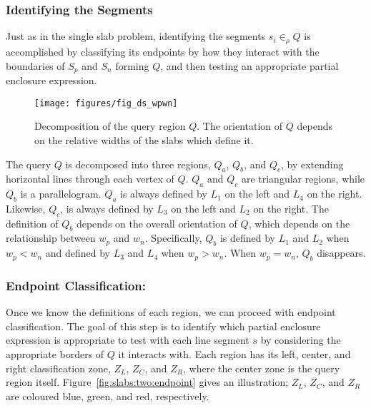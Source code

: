 \subsubsection{Identifying the Segments}
\label{:slabs:two:approach}

Just as in the single slab problem, identifying the segments $s_i \in_\rho Q$ 
is accomplished by classifying its endpoints by how they interact with 
the boundaries of $S_p$ and $S_n$ forming $Q$,  and then testing an appropriate 
partial enclosure expression. 

\begin{figure}[t]
\begin{center}
  \texttt{[image: figures/fig\_ds\_wpwn]}
  \caption[Decomposition of the query region $Q$.]{Decomposition of the query 
region $Q$. The orientation of $Q$ depends on the relative widths of the slabs 
which define it.}
  \label{fig:slabs:two:wpwn}
\end{center}
\end{figure}


The query $Q$ is decomposed into three regions, $Q_a$, $Q_b$, and $Q_c$, by 
extending horizontal lines through each vertex of $Q$.
$Q_a$ and $Q_c$ are triangular regions, while $Q_b$ is a parallelogram. 
$Q_a$ is always defined by $L_1$ on the left and $L_4$ on the right. 
Likewise, $Q_c$, is always defined by $L_3$ on the left and $L_2$ on the right. 
The definition of $Q_b$ depends on the overall orientation of $Q$, which depends 
on the relationship between $w_p$ and $w_n$.
Specifically, $Q_b$ is defined by $L_1$ and $L_2$ when $w_p < w_n$ and defined 
by $L_3$ and $L_4$ when $w_p > w_n$.
When $w_p = w_n$, $Q_b$ disappears.


\subsubsection{Endpoint Classification:}
Once we know the definitions of each region, we can proceed with endpoint 
classification.
The goal of this step is to identify which partial enclosure expression is 
appropriate to test with each line segment $s$ by considering the appropriate 
borders of $Q$ it interacts with. 
Each region has its left, center, and right classification zone, $Z_L$, $Z_C$, 
and $Z_R$, where the center zone is the query region itself.
Figure~\ref{fig:slabs:two:endpoint} gives an illustration; $Z_L$, $Z_C$, and 
$Z_R$ are coloured blue, green, and red, respectively.


